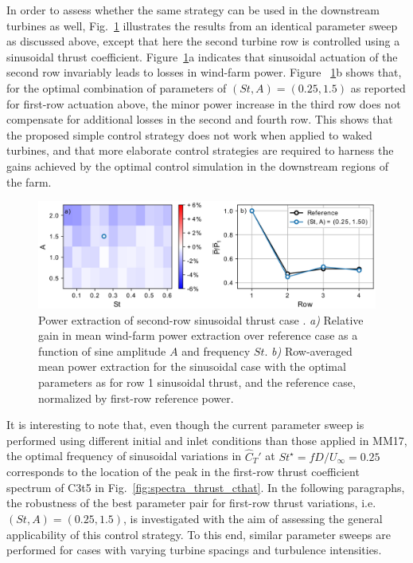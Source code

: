 \documentclass[wes, manuscript]{copernicus}
\begin{document}
In order to assess whether the same strategy can be used in the downstream turbines as well, Fig.~\ref{fig:sinus_row2} illustrates the results from an identical parameter sweep as discussed above, except that here the second turbine row is controlled using a sinusoidal thrust coefficient. Figure~\ref{fig:sinus_row2}a indicates that sinusoidal actuation of the second row invariably leads to losses in wind-farm power. Figure ~\ref{fig:sinus_row2}b  shows that, for the optimal combination of parameters of  $(St, A) = (0.25, 1.5)$ as reported for first-row actuation above, the minor power increase in the third row does not compensate for additional losses in the second and fourth row. This shows that the proposed simple control strategy does not work when applied to waked turbines, and that more elaborate control strategies are required to harness the gains achieved by the optimal control simulation in the downstream regions of the farm. 
\begin{figure}
	\centering
	\includegraphics[width=\textwidth]{figure16}
	\caption{Power extraction of second-row sinusoidal thrust case . \emph{a) } Relative gain in mean wind-farm power extraction over reference case as a function of sine amplitude $A$ and frequency $St$. \emph{b) } Row-averaged mean power extraction for the sinusoidal case with the optimal parameters as for row 1 sinusoidal thrust, and the reference case, normalized by first-row reference power.\label{fig:sinus_row2} }
\end{figure}

It is interesting to note that, even though the current parameter sweep is performed using different initial and inlet conditions than those applied in MM17, the optimal frequency of sinusoidal variations in $\widehat{C}_{T}'$ at $St^\star = f D / U_\infty = 0.25$ corresponds to the location of the peak in the first-row thrust coefficient spectrum of C3t5 in Fig.~\ref{fig:spectra_thrust_cthat}. In the following paragraphs, the robustness of the best parameter pair for first-row thrust variations, i.e. $(St, A) = (0.25, 1.5)$, is investigated with the aim of assessing the general applicability of this control strategy. To this end, similar parameter sweeps are performed for cases with varying turbine spacings and turbulence intensities.
\end{document}
